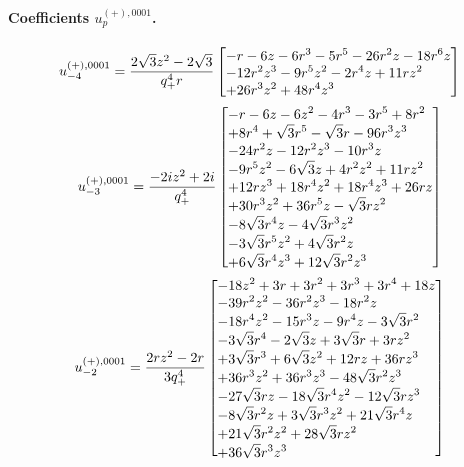 \documentclass[11pt,a4paper]{article}
\begin{document}
\paragraph{Coefficients $u_p^{(+),0001}$.}
\begin{equation}
u_{-4}^{(+),0001}=\frac{2 \sqrt{3} z^{2} - 2 \sqrt{3}}{q_{+}^{4} r}\left[\vcenter{\hbox{\shortstack[l]{$\displaystyle  - r - 6 z - 6 r^{3} - 5 r^{5} - 26 r^{2} z - 18 r^{6} z$\\
$\displaystyle  - 12 r^{2} z^{3} - 9 r^{5} z^{2} - 2 r^{4} z + 11 r z^{2}$\\
$\displaystyle  + 26 r^{3} z^{2} + 48 r^{4} z^{3}$}}}\right]
\label{eq:cat-auxiliary-plus-0001-m4}
\end{equation}
\begin{equation}
u_{-3}^{(+),0001}=\frac{- 2 i z^{2} + 2 i}{q_{+}^{4}}\left[\vcenter{\hbox{\shortstack[l]{$\displaystyle  - r - 6 z - 6 z^{2} - 4 r^{3} - 3 r^{5} + 8 r^{2}$\\
$\displaystyle  + 8 r^{4} + \sqrt{3} r^{5} - \sqrt{3} r - 96 r^{3} z^{3}$\\
$\displaystyle  - 24 r^{2} z - 12 r^{2} z^{3} - 10 r^{3} z$\\
$\displaystyle  - 9 r^{5} z^{2} - 6 \sqrt{3} z + 4 r^{2} z^{2} + 11 r z^{2}$\\
$\displaystyle  + 12 r z^{3} + 18 r^{4} z^{2} + 18 r^{4} z^{3} + 26 r z$\\
$\displaystyle  + 30 r^{3} z^{2} + 36 r^{5} z - \sqrt{3} r z^{2}$\\
$\displaystyle  - 8 \sqrt{3} r^{4} z - 4 \sqrt{3} r^{3} z^{2}$\\
$\displaystyle  - 3 \sqrt{3} r^{5} z^{2} + 4 \sqrt{3} r^{2} z$\\
$\displaystyle  + 6 \sqrt{3} r^{4} z^{3} + 12 \sqrt{3} r^{2} z^{3}$}}}\right]
\label{eq:cat-auxiliary-plus-0001-m3}
\end{equation}
\begin{equation}
u_{-2}^{(+),0001}=\frac{2 r z^{2} - 2 r}{3 q_{+}^{4}}\left[\vcenter{\hbox{\shortstack[l]{$\displaystyle  - 18 z^{2} + 3 r + 3 r^{2} + 3 r^{3} + 3 r^{4} + 18 z$\\
$\displaystyle  - 39 r^{2} z^{2} - 36 r^{2} z^{3} - 18 r^{2} z$\\
$\displaystyle  - 18 r^{4} z^{2} - 15 r^{3} z - 9 r^{4} z - 3 \sqrt{3} r^{2}$\\
$\displaystyle  - 3 \sqrt{3} r^{4} - 2 \sqrt{3} z + 3 \sqrt{3} r + 3 r z^{2}$\\
$\displaystyle  + 3 \sqrt{3} r^{3} + 6 \sqrt{3} z^{2} + 12 r z + 36 r z^{3}$\\
$\displaystyle  + 36 r^{3} z^{2} + 36 r^{3} z^{3} - 48 \sqrt{3} r^{2} z^{3}$\\
$\displaystyle  - 27 \sqrt{3} r z - 18 \sqrt{3} r^{4} z^{2} - 12 \sqrt{3} r z^{3}$\\
$\displaystyle  - 8 \sqrt{3} r^{2} z + 3 \sqrt{3} r^{3} z^{2} + 21 \sqrt{3} r^{4} z$\\
$\displaystyle  + 21 \sqrt{3} r^{2} z^{2} + 28 \sqrt{3} r z^{2}$\\
$\displaystyle  + 36 \sqrt{3} r^{3} z^{3}$}}}\right]
\label{eq:cat-auxiliary-plus-0001-m2}
\end{equation}
\end{document}
